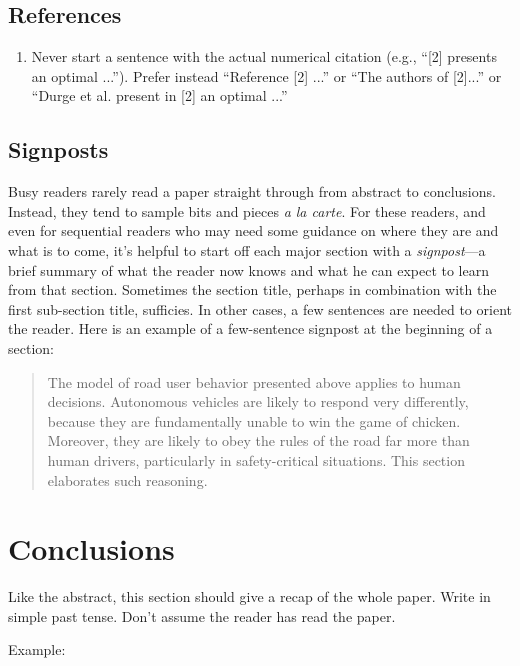 \documentclass[10pt,journal,twocolumn]{IEEEtran} %
\begin{document}
\subsection{References}
\begin{enumerate}
\item Never start a sentence with the actual numerical citation (e.g., ``[2]
  presents an optimal ...'').  Prefer instead ``Reference [2] ...'' or ``The
  authors of [2]...'' or ``Durge et al. present in [2] an optimal ...''
\end{enumerate}

\subsection{Signposts}
Busy readers rarely read a paper straight through from abstract to conclusions.
Instead, they tend to sample bits and pieces \emph{a la carte}.  For these
readers, and even for sequential readers who may need some guidance on where
they are and what is to come, it's helpful to start off each major section with
a \emph{signpost}---a brief summary of what the reader now knows and what he
can expect to learn from that section.  Sometimes the section title, perhaps in
combination with the first sub-section title, sufficies.  In other cases, a few
sentences are needed to orient the reader.  Here is an example of a
few-sentence signpost at the beginning of a section:
\begin{quotation}
  The model of road user behavior presented above applies to human
  decisions. Autonomous vehicles are likely to respond very differently,
  because they are fundamentally unable to win the game of chicken. Moreover,
  they are likely to obey the rules of the road far more than human drivers,
  particularly in safety-critical situations. This section elaborates such
  reasoning.
\end{quotation}


\section{Conclusions}
Like the abstract, this section should give a recap of the whole paper.  Write
in simple past tense.  Don't assume the reader has read the paper.

Example:\\
\end{document}
